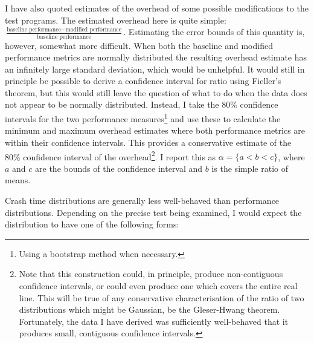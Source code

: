 I have also quoted estimates of the overhead of some possible
modifications to the test programs.  The estimated overhead here is
quite simple: $\frac{\textrm{baseline performance} - \textrm{modified
performance}}{\textrm{baseline performance}}$.  Estimating the error
bounds of this quantity is, however, somewhat more difficult.  When
both the baseline and modified performance metrics are normally
distributed the resulting overhead estimate has an infinitely large
standard deviation, which would be
unhelpful.  It would still in principle be possible to derive a
confidence interval for ratio using Fieller's theorem\needCite{}, but
this would still leave the question of what to do when the data does
not appear to be normally distributed.
Instead, I take the 80\% confidence intervals for the two performance
measures\footnote{Using a bootstrap method when necessary.} and use
these to calculate the minimum and maximum overhead estimates where
both performance metrics are within their confidence intervals.  This
provides a conservative estimate of the 80\% confidence interval of
the overhead\footnote{Note that this construction could, in principle,
produce non-contiguous confidence intervals, or could even produce one
which covers the entire real line.  This will be true of any
conservative characterisation of the ratio of two distributions which
might be Gaussian, be the Gleser-Hwang theorem\needCite{}.
Fortunately, the data I have derived was sufficiently well-behaved
that it produces small, contiguous confidence intervals.}.  I report
this as $\alpha = \{a < b < c\}$, where $a$ and $c$ are the bounds of
the confidence interval and $b$ is the simple ratio of
means.  


Crash time distributions are generally less well-behaved than
performance distributions.  Depending on the precise test being
examined, I would expect the distribution to have one of the following
forms:

